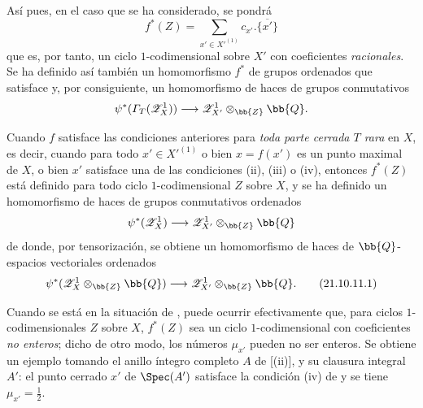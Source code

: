 \begin{env}[21.10.11]
Así pues, en el caso que se ha considerado, se pondrá
\[
  f^*(Z)=\sum_{x'\in X'^{(1)}}c_{x'}.\overline{\{x'\}}
\]
que es, por tanto, un ciclo $1$-codimensional sobre $X'$ con coeficientes \emph{racionales}.
Se ha definido así también un homomorfismo $f^*$ de grupos ordenados que satisface  y, por consiguiente, un homomorfismo de haces de grupos conmutativos
\[
  \psi^*(\varGamma_T(\mathscr{Z}^1_X))\to\mathscr{Z}^1_{X'}\otimes_{\bb{Z}}\bb{Q}.
\]

Cuando $f$ satisface las condiciones anteriores para \emph{toda parte cerrada $T$ rara} en $X$, es decir, cuando para todo $x'\in X'^{(1)}$ o bien $x=f(x')$ es un punto maximal de $X$, o bien $x'$ satisface una de las condiciones (ii), (iii) o (iv), entonces $f^*(Z)$ está definido para todo ciclo $1$-codimensional $Z$ sobre $X$, y se ha definido un homomorfismo de haces de grupos conmutativos ordenados
\[
  \psi^*(\mathscr{Z}^1_X)\to\mathscr{Z}^1_{X'}\otimes_{\bb{Z}}\bb{Q}
\]
de donde, por tensorización, se obtiene un homomorfismo de haces de $\bb{Q}$-espacios vectoriales ordenados
\[
\label{IV.21.10.11.1}
  \psi^*(\mathscr{Z}^1_X\otimes_{\bb{Z}}\bb{Q})\to\mathscr{Z}^1_{X'}\otimes_{\bb{Z}}\bb{Q}.
  \tag{21.10.11.1}
\]
\end{env}

\begin{remark}[21.10.12]
\label{IV.21.10.12}
Cuando se está en la situación de , puede ocurrir efectivamente que, para ciclos $1$-codimensionales $Z$ sobre $X$, $f^*(Z)$ sea un ciclo $1$-codimensional con coeficientes \emph{no enteros}; dicho de otro modo, los números $\mu_{x'}$ pueden no ser enteros.
Se obtiene un ejemplo tomando el anillo íntegro completo $A$ de [(ii)], y su clausura integral $A'$: el punto cerrado $x'$ de $\Spec(A')$ satisface la condición (iv) de  y se tiene $\mu_{x'}=\frac12$.
\end{remark}

